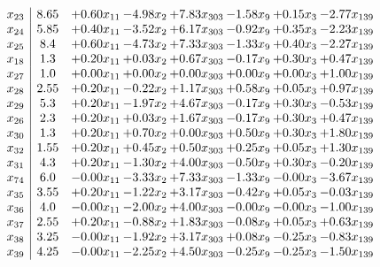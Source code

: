 \documentclass[8pt]{article}
\begin{document}
\[\begin{array}{c| c c@{\hskip 2pt} c@{\hskip 2pt} c@{\hskip 2pt} c@{\hskip 2pt} c@{\hskip 2pt} c@{\hskip 2pt} }
 x_{23}   &  8.65 & +  0.60 x_{11} & -4.98 x_{2} & +  7.83 x_{303} & -1.58 x_{9} & +  0.15 x_{3} & -2.77 x_{139}\\
 x_{24}   &  5.85 & +  0.40 x_{11} & -3.52 x_{2} & +  6.17 x_{303} & -0.92 x_{9} & +  0.35 x_{3} & -2.23 x_{139}\\
 x_{25}   &  8.4 & +  0.60 x_{11} & -4.73 x_{2} & +  7.33 x_{303} & -1.33 x_{9} & +  0.40 x_{3} & -2.27 x_{139}\\
 x_{18}   &  1.3 & +  0.20 x_{11} & +  0.03 x_{2} & +  0.67 x_{303} & -0.17 x_{9} & +  0.30 x_{3} & +  0.47 x_{139}\\
 x_{27}   &  1.0 & +  0.00 x_{11} & +  0.00 x_{2} & +  0.00 x_{303} & +  0.00 x_{9} & +  0.00 x_{3} & +  1.00 x_{139}\\
 x_{28}   &  2.55 & +  0.20 x_{11} & -0.22 x_{2} & +  1.17 x_{303} & +  0.58 x_{9} & +  0.05 x_{3} & +  0.97 x_{139}\\
 x_{29}   &  5.3 & +  0.20 x_{11} & -1.97 x_{2} & +  4.67 x_{303} & -0.17 x_{9} & +  0.30 x_{3} & -0.53 x_{139}\\
 x_{26}   &  2.3 & +  0.20 x_{11} & +  0.03 x_{2} & +  1.67 x_{303} & -0.17 x_{9} & +  0.30 x_{3} & +  0.47 x_{139}\\
 x_{30}   &  1.3 & +  0.20 x_{11} & +  0.70 x_{2} & +  0.00 x_{303} & +  0.50 x_{9} & +  0.30 x_{3} & +  1.80 x_{139}\\
 x_{32}   &  1.55 & +  0.20 x_{11} & +  0.45 x_{2} & +  0.50 x_{303} & +  0.25 x_{9} & +  0.05 x_{3} & +  1.30 x_{139}\\
 x_{31}   &  4.3 & +  0.20 x_{11} & -1.30 x_{2} & +  4.00 x_{303} & -0.50 x_{9} & +  0.30 x_{3} & -0.20 x_{139}\\
 x_{74}   &  6.0 & -0.00 x_{11} & -3.33 x_{2} & +  7.33 x_{303} & -1.33 x_{9} & -0.00 x_{3} & -3.67 x_{139}\\
 x_{35}   &  3.55 & +  0.20 x_{11} & -1.22 x_{2} & +  3.17 x_{303} & -0.42 x_{9} & +  0.05 x_{3} & -0.03 x_{139}\\
 x_{36}   &  4.0 & -0.00 x_{11} & -2.00 x_{2} & +  4.00 x_{303} & -0.00 x_{9} & -0.00 x_{3} & -1.00 x_{139}\\
 x_{37}   &  2.55 & +  0.20 x_{11} & -0.88 x_{2} & +  1.83 x_{303} & -0.08 x_{9} & +  0.05 x_{3} & +  0.63 x_{139}\\
 x_{38}   &  3.25 & -0.00 x_{11} & -1.92 x_{2} & +  3.17 x_{303} & +  0.08 x_{9} & -0.25 x_{3} & -0.83 x_{139}\\
 x_{39}   &  4.25 & -0.00 x_{11} & -2.25 x_{2} & +  4.50 x_{303} & -0.25 x_{9} & -0.25 x_{3} & -1.50 x_{139}\\

\end{array}\]
\end{document}
